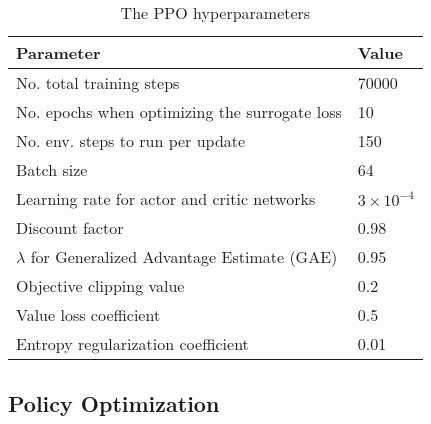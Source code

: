 \documentclass[letterpaper, 10 pt, conference]{ieeeconf}
\newcommand{\Rc}{R_2}
\begin{document}
\begin{table}[t]
\caption{The PPO hyperparameters}
\centering
\begin{tabular}{ll}
\hline
\textbf{Parameter} & \textbf{Value} \\ \hline
No. total training steps & 70000 \\
No. epochs when optimizing the surrogate loss & 10 \\
No. env. steps to run per update & 150 \\
Batch size & 64 \\  %
Learning rate for actor and critic networks %
& $3 \times 10^{-4}$ \\
Discount factor %
& 0.98 \\
$\lambda$ for Generalized Advantage Estimate (GAE) 
& 0.95 \\
Objective clipping value %
& 0.2 \\ %
Value loss coefficient & 0.5 \\
Entropy regularization coefficient & 0.01 \\
\hline
\end{tabular}
\label{tab:PPO_train_parameter}
\end{table}







\subsection{Policy Optimization} \label{Method_Policy_optimization}
\end{document}
